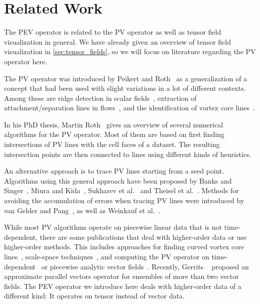 \section{Related Work} %
\label{sec:pev_related_work}
%
The \ac{PEV} operator is related to the \ac{PV} operator as well as tensor field
visualization in general.
%
We have already given an overview of tensor field visualization in
\cref{sec:tensor_fields}, so we will focus on literature regarding the \ac{PV}
operator here.
%

%
The \ac{PV} operator was introduced by Peikert and Roth~\cite{Peikert1999} as a
generalization of a concept that had been used with slight variations in a lot
of different contexts.
%
Among these are ridge detection in scalar fields~\cite{Haralick1983},
extraction of attachment/separation lines in flows~\cite{Kenwright1999},
and the identification of vortex core lines~\cite{Sujudi1995,Banks1995}.
%

%
In his PhD thesis, Martin Roth~\cite{Roth2000} gives an overview of several
numerical algorithms for the \ac{PV} operator.
%
Most of them are based on first finding intersections of \ac{PV} lines with the
cell faces of a dataset.
%
The resulting intersection points are then connected to lines using different
kinds of heuristics.
%

%
An alternative approach is to trace \ac{PV} lines starting from a seed point.
%
Algorithms using this general approach have been proposed by Banks and
Singer~\cite{Banks1995}, Miura and Kida~\cite{Miura1997}, Sukharev et
al.~\cite{Sukharev2006} and Theisel et al.~\cite{Theisel2003a}.
%
Methods for avoiding the accumulation of errors when tracing \ac{PV} lines were
introduced by van Gelder and Pang~\cite{Gelder2009}, as well as Weinkauf et
al.~\cite{Weinkauf2011}.
%

%
While most \ac{PV} algorithms operate on piecewise linear data that is not
time-dependent, there are some publications that deal with higher-order data
or use higher-order methods.
%
This includes approaches for finding curved vortex core lines~\cite{Roth1998},
scale-space techniques~\cite{Bauer2002}, and computing the \ac{PV} operator on
time-dependent~\cite{Theisel2005,Fuchs2007} or piecewise analytic vector
fields~\cite{Pagot2011}.
%
Recently, Gerrits \etal~\cite{Gerrits2018} proposed an approximate parallel
vectors operator for ensembles of more than two vector fields.
%
The \ac{PEV} operator we introduce here deals with higher-order data of a
different kind: It operates on tensor instead of vector data.
%
